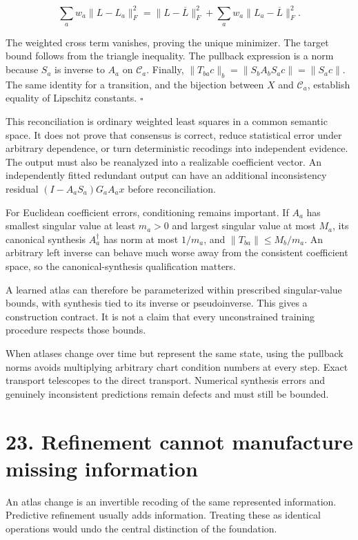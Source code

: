 \documentclass[11pt,letterpaper]{article}
\begin{document}
\[
\sum_aw_a\|L-L_a\|_F^2
=\|L-\overline L\|_F^2+
\sum_aw_a\|L_a-\overline L\|_F^2.
\]

The weighted cross term vanishes, proving the unique minimizer. The
target bound follows from the triangle inequality. The pullback
expression is a norm because \(S_a\) is inverse to \(A_a\) on
\(\mathcal C_a\). Finally, \(\|T_{ba}c\|_b=\|S_bA_bS_ac\|=\|S_ac\|\).
The same identity for a transition, and the bijection between \(X\) and
\(\mathcal C_a\), establish equality of Lipschitz constants. \(\square\)

This reconciliation is ordinary weighted least squares in a common
semantic space. It does not prove that consensus is correct, reduce
statistical error under arbitrary dependence, or turn deterministic
recodings into independent evidence. The output must also be reanalyzed
into a realizable coefficient vector. An independently fitted redundant
output can have an additional inconsistency residual
\((I-A_aS_a)G_aA_ax\) before reconciliation.

For Euclidean coefficient errors, conditioning remains important. If
\(A_a\) has smallest singular value at least \(m_a>0\) and largest
singular value at most \(M_a\), its canonical synthesis \(A_a^\dagger\)
has norm at most \(1/m_a\), and \(\|T_{ba}\|\leq M_b/m_a\). An arbitrary
left inverse can behave much worse away from the consistent coefficient
space, so the canonical-synthesis qualification matters.

A learned atlas can therefore be parameterized within prescribed
singular-value bounds, with synthesis tied to its inverse or
pseudoinverse. This gives a construction contract. It is not a claim
that every unconstrained training procedure respects those bounds.

When atlases change over time but represent the same state, using the
pullback norms avoids multiplying arbitrary chart condition numbers at
every step. Exact transport telescopes to the direct transport.
Numerical synthesis errors and genuinely inconsistent predictions remain
defects and must still be bounded.

\section{23. Refinement cannot manufacture missing
information}\label{refinement-cannot-manufacture-missing-information}

An atlas change is an invertible recoding of the same represented
information. Predictive refinement usually adds information. Treating
these as identical operations would undo the central distinction of the
foundation.
\end{document}
